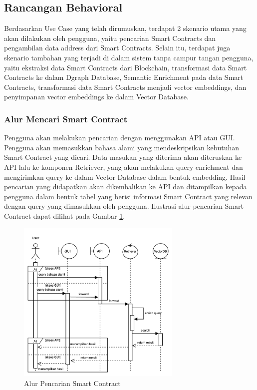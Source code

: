 \subsection{Rancangan Behavioral}

Berdasarkan Use Case yang telah dirumuskan, terdapat 2 skenario utama yang akan dilakukan oleh pengguna, yaitu pencarian Smart Contracts dan pengambilan data address dari Smart Contracts. Selain itu, terdapat juga skenario tambahan yang terjadi di dalam sistem tanpa campur tangan pengguna, yaitu ekstraksi data Smart Contracts dari Blockchain, transformasi data Smart Contracts ke dalam Dgraph Database, Semantic Enrichment pada data Smart Contracts, transformasi data Smart Contracts menjadi vector embeddings, dan penyimpanan vector embeddings ke dalam Vector Database.

\subsubsection{Alur Mencari Smart Contract}

Pengguna akan melakukan pencarian dengan menggunakan API atau GUI. Pengguna akan memasukkan bahasa alami yang mendeskripsikan kebutuhan Smart Contract yang dicari. Data masukan yang diterima akan diteruskan ke API lalu ke komponen Retriever, yang akan melakukan query enrichment dan mengirimkan query ke dalam Vector Database dalam bentuk embedding. Hasil pencarian yang didapatkan akan dikembalikan ke API dan ditampilkan kepada pengguna dalam bentuk tabel yang berisi informasi Smart Contract yang relevan dengan query yang dimasukkan oleh pengguna. Ilustrasi alur pencarian Smart Contract dapat dilihat pada Gambar \ref{image:alur-pencarian-smart-contract}.

\begin{figure}[ht]
    \centering
    \includegraphics[width=0.7\textwidth]{resources/chapter-3/sequence-1.png}
    \caption{Alur Pencarian Smart Contract}
    \label{image:alur-pencarian-smart-contract}
\end{figure}


